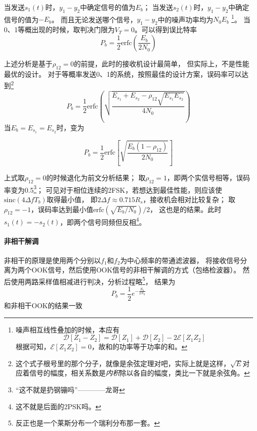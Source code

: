     当发送$s_1(t)$时，$y_1-y_2$中确定信号的值为$E_b$；
    当发送$s_2(t)$时，$y_1-y_2$中确定信号的值为$-E_b$。
    而且无论发送哪个信号，$y_1-y_2$中的噪声功率均为$N_0E_b$
    \footnote{噪声相互线性叠加的时候，本应有
    \begin{equation*}
        \mathscr{D}[Z_1-Z_2]=\mathscr{D}[Z_1]+\mathscr{D}[Z_2]-2\mathscr{E}[Z_1Z_2]
    \end{equation*}
    根据可知，$\mathscr{E}[Z_1Z_2]=0$，故和的功率等于功率的和。 }。
    当0、1等概出现的时候，取判决门限为$V_T=0$。可以得到误比特率
    \begin{equation}
        P_b=\frac{1}{2}\text{erfc}\left(\frac{E_b}{2N_0}\right)
    \end{equation}

    上述分析是基于$\rho_{12}=0$的前提，此时的接收机设计最简单，
    但实际上，不是性能最优的设计。
    对于等概率发送0、1的系统，按照最佳的设计方案，误码率可以达到\footnote{这个式子根号里的那个分子，就像是余弦定理对吧，实际上就是这样，$\sqrt{E}$对应着信号的幅度，相关系数是\emph{内积}除以各自的幅度，类比一下就是余弦角。}
    \begin{equation}
        P_b=\frac{1}{2}\text{erfc}\left(\sqrt{\frac{E_{s_1}+E_{s_2}-\rho_{12}\sqrt{E_{s_1}E_{s_2}}}{4N_0}}\right)
    \end{equation}
    当$E_b=E_{s_1}=E_{s_2}$时，变为
    
    \vspace{-2pt}
    \begin{equation}\label{eq:BinaryBER}
        P_b=\frac{1}{2}\text{erfc}\left[\sqrt{\frac{E_b(1-\rho_{12})}{2N_0}}\right]
    \end{equation}

    上式取$\rho_{12}=0$的时候退化为前文分析结果；
    取$\rho_{12}=1$，即两个实信号相等，误码率变为0.5\footnote{“这不就是扔钢镚吗”————龙哥}； 
    可见对于相位连续的2FSK，若想达到最佳性能，则应该使$\text{sinc}(4\Delta fT_b)$取得最小值，
    即$2\Delta f\approx 0.715R_s$，接收机会相对比较复杂；
    取$\rho_{12}=-1$，误码率达到最小值$\text{erfc}\left(\sqrt{E_b/N_0}\right)/2$，
    这也是的结果。此时$s_1(t)=-s_2(t)$，即两个信号同频但反相\footnote{这不就是后面的2PSK吗。}。

    \paragraph{非相干解调}\mbox{}

    非相干的原理是使用两个分别以$f_1$和$f_2$为中心频率的带通滤波器，
    将接收信号分离为两个OOK信号，然后使用OOK信号的非相干解调的方式（包络检波器）。
    然后使用两路采样值相减进行判决，分析过程略\footnote{反正也是一个莱斯分布一个瑞利分布那一套。}，
    结果为
    \begin{equation}
        P_b=\frac{1}{2}e^{-\frac{E_b}{2N_0}}
    \end{equation}
    和非相干OOK的结果一致

